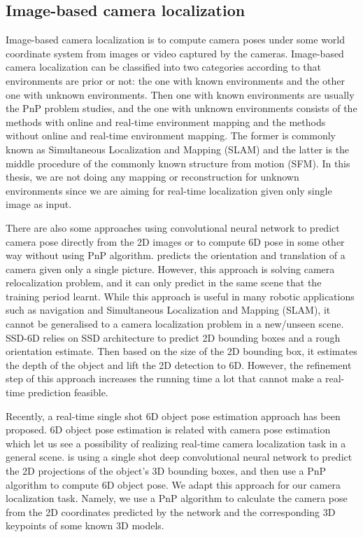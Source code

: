 \subsection{Image-based camera localization}

Image-based camera localization \cite{wu2018image} is to compute camera poses under some world coordinate system from images or video captured by the cameras. Image-based camera localization can be classified into two categories according to that environments are prior or not: the one with known environments and the other one with unknown environments. Then one with known environments are usually the PnP problem studies, and the one with unknown environments consists of the methods with online and real-time environment mapping and the methods without online and real-time environment mapping. The former is commonly known as Simultaneous Localization and Mapping (SLAM) and the latter is the middle procedure of the commonly known structure from motion (SFM). In this thesis, we are not doing any mapping or reconstruction for unknown environments since we are aiming for real-time localization given only single image as input.

There are also some approaches using convolutional neural network to predict camera pose directly from the 2D images or to compute 6D pose in some other way without using PnP algorithm. \cite{wu2017delving} predicts the orientation and translation of a camera given only a single picture. However, this approach is solving camera relocalization problem, and it can only predict in the same scene that the training period learnt. While this approach is useful in many robotic applications such as navigation and Simultaneous Localization and Mapping (SLAM), it cannot be generalised to a camera localization problem in a new/unseen scene. SSD-6D \cite{kehl2017ssd} relies on SSD architecture to predict 2D bounding boxes and a rough orientation estimate. Then based on the size of the 2D bounding box, it estimates the depth of the object and lift the 2D detection to 6D. However, the refinement step of this approach increases the running time a lot that cannot make a real-time prediction feasible.

Recently, a real-time single shot 6D object pose estimation approach \cite{tekin2018real} has been proposed. 6D object pose estimation is related with camera pose estimation which let us see a possibility of realizing real-time camera localization task in a general scene. \cite{tekin2018real} is using a single shot deep convolutional neural network to predict the 2D projections of the object's 3D bounding boxes, and then use a PnP algorithm to compute 6D object pose. We adapt this approach for our camera localization task. Namely, we use a PnP algorithm to calculate the camera pose from the 2D coordinates predicted by the network and the corresponding 3D keypoints of some known 3D models.

